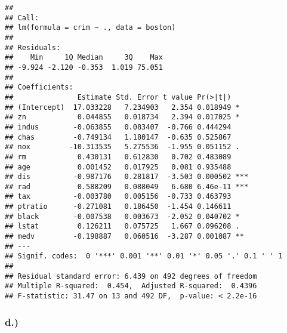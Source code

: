 \documentclass[
]{article}
\begin{document}
\begin{verbatim}
## 
## Call:
## lm(formula = crim ~ ., data = boston)
## 
## Residuals:
##    Min     1Q Median     3Q    Max 
## -9.924 -2.120 -0.353  1.019 75.051 
## 
## Coefficients:
##               Estimate Std. Error t value Pr(>|t|)    
## (Intercept)  17.033228   7.234903   2.354 0.018949 *  
## zn            0.044855   0.018734   2.394 0.017025 *  
## indus        -0.063855   0.083407  -0.766 0.444294    
## chas         -0.749134   1.180147  -0.635 0.525867    
## nox         -10.313535   5.275536  -1.955 0.051152 .  
## rm            0.430131   0.612830   0.702 0.483089    
## age           0.001452   0.017925   0.081 0.935488    
## dis          -0.987176   0.281817  -3.503 0.000502 ***
## rad           0.588209   0.088049   6.680 6.46e-11 ***
## tax          -0.003780   0.005156  -0.733 0.463793    
## ptratio      -0.271081   0.186450  -1.454 0.146611    
## black        -0.007538   0.003673  -2.052 0.040702 *  
## lstat         0.126211   0.075725   1.667 0.096208 .  
## medv         -0.198887   0.060516  -3.287 0.001087 ** 
## ---
## Signif. codes:  0 '***' 0.001 '**' 0.01 '*' 0.05 '.' 0.1 ' ' 1
## 
## Residual standard error: 6.439 on 492 degrees of freedom
## Multiple R-squared:  0.454,  Adjusted R-squared:  0.4396 
## F-statistic: 31.47 on 13 and 492 DF,  p-value: < 2.2e-16
\end{verbatim}

\hypertarget{d.}{%
\subsubsection{d.)}\label{d.}}
\end{document}
